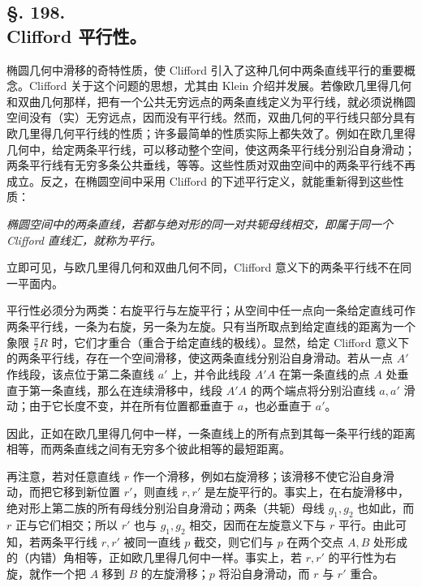 \subsection*{§. 198.\\ Clifford 平行性。}

椭圆几何中滑移的奇特性质，使 Clifford 引入了这种几何中两条直线平行的重要概念。Clifford 关于这个问题的思想，尤其由 Klein 介绍并发展。若像欧几里得几何和双曲几何那样，把有一个公共无穷远点的两条直线定义为平行线，就必须说椭圆空间没有（实）无穷远点，因而没有平行线。然而，双曲几何的平行线只部分具有欧几里得几何平行线的性质；许多最简单的性质实际上都失效了。例如在欧几里得几何中，给定两条平行线，可以移动整个空间，使这两条平行线分别沿自身滑动；两条平行线有无穷多条公共垂线，等等。这些性质对双曲空间中的两条平行线不再成立。反之，在椭圆空间中采用 Clifford 的下述平行定义，就能重新得到这些性质：

\emph{椭圆空间中的两条直线，若都与绝对形的同一对共轭母线相交，即属于同一个 Clifford 直线汇，就称为平行。}

立即可见，与欧几里得几何和双曲几何不同，Clifford 意义下的两条平行线不在同一平面内。

平行性必须分为两类：右旋平行与左旋平行；从空间中任一点向一条给定直线可作两条平行线，一条为右旋，另一条为左旋。只有当所取点到给定直线的距离为一个象限 $\frac\pi2R$ 时，它们才重合（重合于给定直线的极线）。显然，给定 Clifford 意义下的两条平行线，存在一个空间滑移，使这两条直线分别沿自身滑动。若从一点 $A'$ 作线段，该点位于第二条直线 $a'$ 上，并令此线段 $A'A$ 在第一条直线的点 $A$ 处垂直于第一条直线，那么在连续滑移中，线段 $A'A$ 的两个端点将分别沿直线 $a,a'$ 滑动；由于它长度不变，并在所有位置都垂直于 $a$，也必垂直于 $a'$。

因此，正如在欧几里得几何中一样，一条直线上的所有点到其每一条平行线的距离相等，而两条直线之间有无穷多个彼此相等的最短距离。

再注意，若对任意直线 $r$ 作一个滑移，例如右旋滑移；该滑移不使它沿自身滑动，而把它移到新位置 $r'$，则直线 $r,r'$ 是左旋平行的。事实上，在右旋滑移中，绝对形上第二族的所有母线分别沿自身滑动；两条（共轭）母线 $g_1,g_2$ 也如此，而 $r$ 正与它们相交；所以 $r'$ 也与 $g_1,g_2$ 相交，因而在左旋意义下与 $r$ 平行。由此可知，若两条平行线 $r,r'$ 被同一直线 $p$ 截交，则它们与 $p$ 在两个交点 $A,B$ 处形成的（内错）角相等，正如欧几里得几何中一样。事实上，若 $r,r'$ 的平行性为右旋，就作一个把 $A$ 移到 $B$ 的左旋滑移；$p$ 将沿自身滑动，而 $r$ 与 $r'$ 重合。
